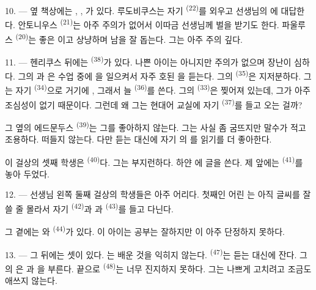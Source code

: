 10. --- 옆 책상에는 , , 가
있다. 루도비쿠스는 자기  \textsuperscript{(22)}를 외우고 선생님의
에 대답한다. 안토니우스 \textsuperscript{(21)}는 아주 주의가 없어서
이따금 선생님께 벌을 받기도 한다. 파울루스 \textsuperscript{(20)}는 좋은
이고 상냥하며 남을 잘 돕는다. 그는 아주 주의 깊다.

\VUsaut{4.2mm}
\VUsaut{3.2mm}

11. --- 헨리쿠스 뒤에는  \textsuperscript{(38)}가 있다. 나쁜
아이는 아니지만  주의가 없으며 장난이 심하다. 그의 과
은 수업 중에 을 일으켜서 자주 호된
을 듣는다. 그의  \textsuperscript{(35)}은 지저분하다.
그는 자기  \textsuperscript{(34)}으로 거기에 , 그래서
늘  \textsuperscript{(36)}를 쓴다. 그의 
\textsuperscript{(33)}은 찢어져 있는데, 그가 아주 조심성이 없기 때문이다. 그런데 왜
그는 현대어 교실에 자기  \textsuperscript{(37)}를 들고 오는 걸까?

그 옆의 에드문두스 \textsuperscript{(39)}는 그를 좋아하지 않는다. 그는 사실 좀
굼뜨지만 말수가 적고 조용하다. 떠들지 않는다. 다만 듣는 대신에 자기
의 를 읽기를 더 좋아한다.

이 걸상의 셋째 학생은  \textsuperscript{(40)}다. 그는 부지런하다.
하얀 에 글을 쓴다. 제 앞에는  \textsuperscript{(41)}를
놓아 두었다.

12. --- 선생님 왼쪽 둘째 걸상의 학생들은 아주 어리다. 첫째인 어린 는
아직 글씨를 잘 쓸 줄 몰라서 자기  \textsuperscript{(42)}과
과  \textsuperscript{(43)}를 들고 다닌다.

그 곁에는 와  \textsuperscript{(44)}가
있다. 이 아이는 공부는 잘하지만 이 아주 단정하지 못하다.

13. --- 그 뒤에는  셋이 있다. 는 배운 것을
익히지 않는다.  \textsuperscript{(47)}는 듣는 대신에 잔다. 그의
은 과 을 부른다. 끝으로
 \textsuperscript{(48)}는 너무 진지하지 못하다. 그는 나쁘게
 고치려고 조금도 애쓰지 않는다.

